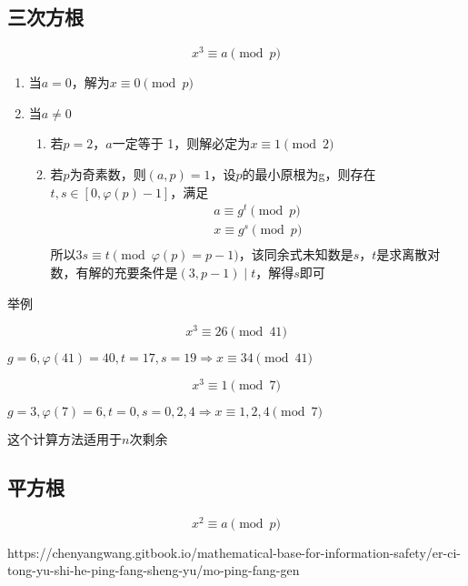 \documentclass{article}
\begin{document}
\subsection{三次方根}

\begin{equation}
    x^3\equiv a\pmod{p}
\end{equation}

\begin{enumerate}
    \item 当$a=0$，解为$x\equiv 0\pmod{p}$
    \item 当$a\neq 0$
    \begin{enumerate}
        \item 若$p=2$，$a$一定等于 1，则解必定为$x\equiv 1\pmod{2}$
        \item 若$p$为奇素数，则$(a,p)=1$，设$p$的最小原根为g，则存在$t,s\in[0,\varphi(p)-1]$，满足
        \begin{align}
            a\equiv g^t\pmod{p}\\
            x\equiv g^s\pmod{p}\\
        \end{align}
        所以$3s\equiv t\pmod{\varphi(p)=p-1}$，该同余式未知数是$s$，$t$是求离散对数，有解的充要条件是$(3,p-1)\mid t$，解得$s$即可
    \end{enumerate}
\end{enumerate}

举例

\begin{equation}
    x^3\equiv 26\pmod{41}
\end{equation}

$g=6,\varphi(41)=40,t=17,s=19\Rightarrow x\equiv 34\pmod{41}$

\begin{equation}
    x^3\equiv 1\pmod{7}
\end{equation}

$g=3,\varphi(7)=6,t=0,s=0,2,4\Rightarrow x\equiv 1,2,4\pmod{7}$

$\textbf{这个计算方法适用于$n$次剩余}$

\subsection{平方根}

\begin{equation}
    x^2\equiv a\pmod{p}
\end{equation}

https://chenyangwang.gitbook.io/mathematical-base-for-information-safety/er-ci-tong-yu-shi-he-ping-fang-sheng-yu/mo-ping-fang-gen
\end{document}

